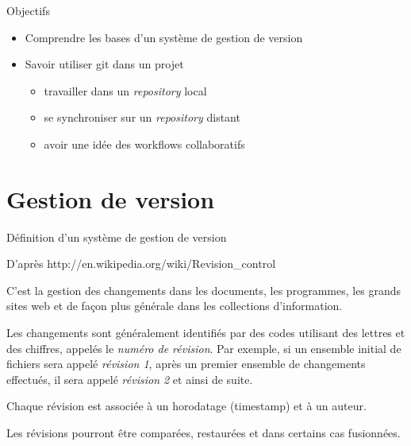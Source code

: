 \begin{frame}{%
\protect\hypertarget{objectifs}{%
Objectifs}}

\begin{itemize}
\tightlist
\item
  Comprendre les bases d’un système de gestion de version
\item
  Savoir utiliser git dans un projet

  \begin{itemize}
  \tightlist
  \item
    travailler dans un \emph{repository} local
  \item
    se synchroniser sur un \emph{repository} distant
  \item
    avoir une idée des workflows collaboratifs
  \end{itemize}
\end{itemize}

\end{frame}

\hypertarget{gestion-de-version}{%
\section{Gestion de version}\label{gestion-de-version}}

\begin{frame}{%
\protect\hypertarget{duxe9finition-dun-systuxe8me-de-gestion-de-version}{%
Définition d’un système de gestion de version}}

D’après http://en.wikipedia.org/wiki/Revision\_control

C’est la gestion des changements dans les documents, les programmes, les
grands sites web et de façon plus générale dans les collections
d’information.

Les changements sont généralement identifiés par des codes utilisant des
lettres et des chiffres, appelés le \emph{numéro de révision}. Par
exemple, si un ensemble initial de fichiers sera appelé \emph{révision
1}, après un premier ensemble de changements effectués, il sera appelé
\emph{révision 2} et ainsi de suite.

Chaque révision est associée à un horodatage (timestamp) et à un auteur.

Les révisions pourront être comparées, restaurées et dans certains cas
fusionnées.

\end{frame}

